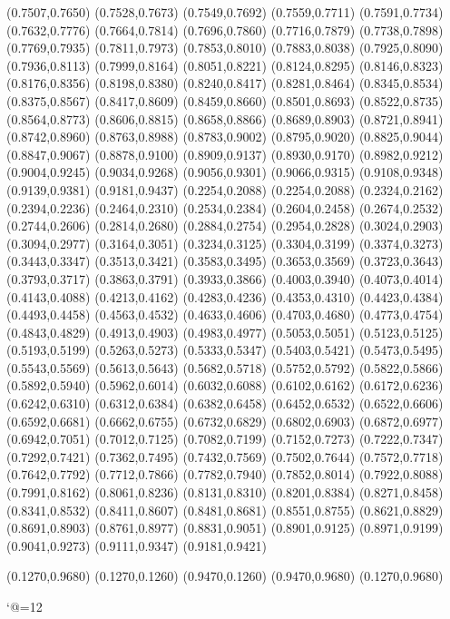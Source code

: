 \PST@Diamond(0.7507,0.7650)
\PST@Diamond(0.7528,0.7673)
\PST@Diamond(0.7549,0.7692)
\PST@Diamond(0.7559,0.7711)
\PST@Diamond(0.7591,0.7734)
\PST@Diamond(0.7632,0.7776)
\PST@Diamond(0.7664,0.7814)
\PST@Diamond(0.7696,0.7860)
\PST@Diamond(0.7716,0.7879)
\PST@Diamond(0.7738,0.7898)
\PST@Diamond(0.7769,0.7935)
\PST@Diamond(0.7811,0.7973)
\PST@Diamond(0.7853,0.8010)
\PST@Diamond(0.7883,0.8038)
\PST@Diamond(0.7925,0.8090)
\PST@Diamond(0.7936,0.8113)
\PST@Diamond(0.7999,0.8164)
\PST@Diamond(0.8051,0.8221)
\PST@Diamond(0.8124,0.8295)
\PST@Diamond(0.8146,0.8323)
\PST@Diamond(0.8176,0.8356)
\PST@Diamond(0.8198,0.8380)
\PST@Diamond(0.8240,0.8417)
\PST@Diamond(0.8281,0.8464)
\PST@Diamond(0.8345,0.8534)
\PST@Diamond(0.8375,0.8567)
\PST@Diamond(0.8417,0.8609)
\PST@Diamond(0.8459,0.8660)
\PST@Diamond(0.8501,0.8693)
\PST@Diamond(0.8522,0.8735)
\PST@Diamond(0.8564,0.8773)
\PST@Diamond(0.8606,0.8815)
\PST@Diamond(0.8658,0.8866)
\PST@Diamond(0.8689,0.8903)
\PST@Diamond(0.8721,0.8941)
\PST@Diamond(0.8742,0.8960)
\PST@Diamond(0.8763,0.8988)
\PST@Diamond(0.8783,0.9002)
\PST@Diamond(0.8795,0.9020)
\PST@Diamond(0.8825,0.9044)
\PST@Diamond(0.8847,0.9067)
\PST@Diamond(0.8878,0.9100)
\PST@Diamond(0.8909,0.9137)
\PST@Diamond(0.8930,0.9170)
\PST@Diamond(0.8982,0.9212)
\PST@Diamond(0.9004,0.9245)
\PST@Diamond(0.9034,0.9268)
\PST@Diamond(0.9056,0.9301)
\PST@Diamond(0.9066,0.9315)
\PST@Diamond(0.9108,0.9348)
\PST@Diamond(0.9139,0.9381)
\PST@Diamond(0.9181,0.9437)
\PST@Dashed(0.2254,0.2088)
(0.2254,0.2088)
(0.2324,0.2162)
(0.2394,0.2236)
(0.2464,0.2310)
(0.2534,0.2384)
(0.2604,0.2458)
(0.2674,0.2532)
(0.2744,0.2606)
(0.2814,0.2680)
(0.2884,0.2754)
(0.2954,0.2828)
(0.3024,0.2903)
(0.3094,0.2977)
(0.3164,0.3051)
(0.3234,0.3125)
(0.3304,0.3199)
(0.3374,0.3273)
(0.3443,0.3347)
(0.3513,0.3421)
(0.3583,0.3495)
(0.3653,0.3569)
(0.3723,0.3643)
(0.3793,0.3717)
(0.3863,0.3791)
(0.3933,0.3866)
(0.4003,0.3940)
(0.4073,0.4014)
(0.4143,0.4088)
(0.4213,0.4162)
(0.4283,0.4236)
(0.4353,0.4310)
(0.4423,0.4384)
(0.4493,0.4458)
(0.4563,0.4532)
(0.4633,0.4606)
(0.4703,0.4680)
(0.4773,0.4754)
(0.4843,0.4829)
(0.4913,0.4903)
(0.4983,0.4977)
(0.5053,0.5051)
(0.5123,0.5125)
(0.5193,0.5199)
(0.5263,0.5273)
(0.5333,0.5347)
(0.5403,0.5421)
(0.5473,0.5495)
(0.5543,0.5569)
(0.5613,0.5643)
(0.5682,0.5718)
(0.5752,0.5792)
(0.5822,0.5866)
(0.5892,0.5940)
(0.5962,0.6014)
(0.6032,0.6088)
(0.6102,0.6162)
(0.6172,0.6236)
(0.6242,0.6310)
(0.6312,0.6384)
(0.6382,0.6458)
(0.6452,0.6532)
(0.6522,0.6606)
(0.6592,0.6681)
(0.6662,0.6755)
(0.6732,0.6829)
(0.6802,0.6903)
(0.6872,0.6977)
(0.6942,0.7051)
(0.7012,0.7125)
(0.7082,0.7199)
(0.7152,0.7273)
(0.7222,0.7347)
(0.7292,0.7421)
(0.7362,0.7495)
(0.7432,0.7569)
(0.7502,0.7644)
(0.7572,0.7718)
(0.7642,0.7792)
(0.7712,0.7866)
(0.7782,0.7940)
(0.7852,0.8014)
(0.7922,0.8088)
(0.7991,0.8162)
(0.8061,0.8236)
(0.8131,0.8310)
(0.8201,0.8384)
(0.8271,0.8458)
(0.8341,0.8532)
(0.8411,0.8607)
(0.8481,0.8681)
(0.8551,0.8755)
(0.8621,0.8829)
(0.8691,0.8903)
(0.8761,0.8977)
(0.8831,0.9051)
(0.8901,0.9125)
(0.8971,0.9199)
(0.9041,0.9273)
(0.9111,0.9347)
(0.9181,0.9421)

\PST@Border(0.1270,0.9680)
(0.1270,0.1260)
(0.9470,0.1260)
(0.9470,0.9680)
(0.1270,0.9680)

\catcode`@=12
\fi
\endpspicture
